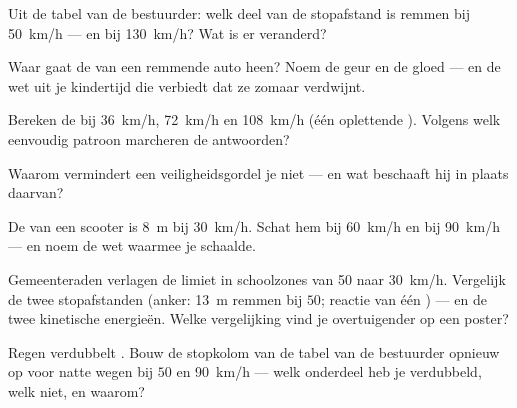\begin{exercise}[$\star$]\label{exo:g9:kinetic-energy-safety:5}
Uit de tabel van de bestuurder: welk deel van de stopafstand is remmen
bij \qty{50}{km/h} --- en bij \qty{130}{km/h}? Wat is er veranderd?
\end{exercise}

\begin{exercise}[$\star$]\label{exo:g9:kinetic-energy-safety:6}
Waar gaat de  van een remmende auto heen? Noem
de geur en de gloed --- en de wet uit je kindertijd die verbiedt dat ze
zomaar verdwijnt.
\end{exercise}

\begin{exercise}[$\star$]\label{exo:g9:kinetic-energy-safety:7}
Bereken de  bij \qty{36}{km/h}, \qty{72}{km/h} en
\qty{108}{km/h} (één oplettende ). Volgens welk eenvoudig patroon
marcheren de antwoorden?
\end{exercise}

\begin{exercise}[$\star$]\label{exo:g9:kinetic-energy-safety:8}
Waarom vermindert een veiligheidsgordel je 
niet --- en wat beschaaft hij in plaats daarvan?
\end{exercise}

\begin{exercise}[$\star\star$]\label{exo:g9:kinetic-energy-safety:9}
De  van een scooter is \qty{8}{m} bij \qty{30}{km/h}.
Schat hem bij \qty{60}{km/h} en bij \qty{90}{km/h} --- en noem de wet
waarmee je schaalde.
\end{exercise}

\begin{exercise}[$\star\star$]\label{exo:g9:kinetic-energy-safety:10}
Gemeenteraden verlagen de limiet in schoolzones van \qty{50}{} naar
\qty{30}{km/h}. Vergelijk de twee stopafstanden (anker: \qty{13}{m}
remmen bij $50$; reactie van één ) --- en de twee kinetische
energieën. Welke vergelijking vind je overtuigender op een poster?
\end{exercise}

\begin{exercise}[$\star\star$]\label{exo:g9:kinetic-energy-safety:11}
Regen verdubbelt . Bouw de stopkolom van de tabel van
de bestuurder opnieuw op voor natte wegen bij $50$ en \qty{90}{km/h} ---
welk onderdeel heb je verdubbeld, welk niet, en waarom?
\end{exercise}

